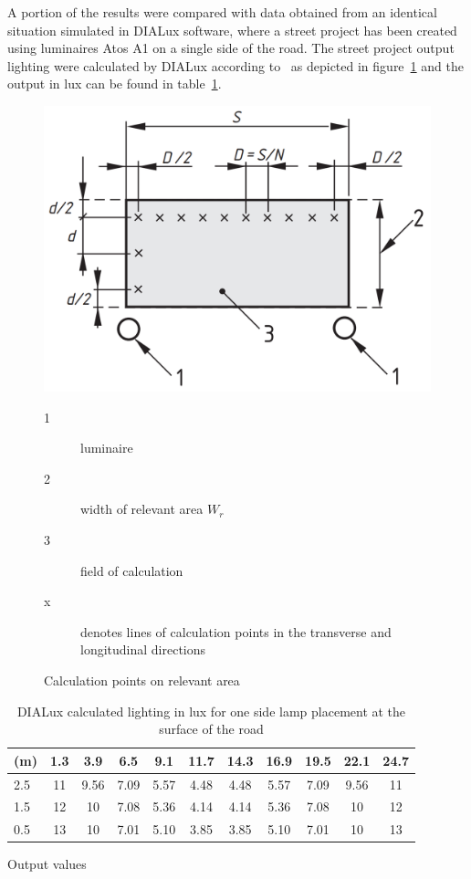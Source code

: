A portion of the results were compared with data obtained from an identical situation simulated in DIALux software, where a street project has been created using luminaires Atos A1 on a single side of the road. The street project output lighting were calculated by DIALux according to~\cite{CSN_EN_13201-3} as depicted in figure~\ref{fig:lumIntDistr} and the output in lux can be found in table~\ref{tab:DialuxOneSideLamps}.

\begin{figure}[htb]
  \centering
  \includegraphics[width=0.8\columnwidth]{13201-3_points}
	\begin{description}
		\item[1] luminaire
		\item[2] width of relevant area $W_{r}$
		\item[3] field of calculation
		\item[x] denotes lines of calculation points in the transverse and longitudinal directions
	\end{description}
	\caption{Calculation points on relevant area \cite{CSN_EN_13201-3}}
  \label{fig:lumIntDistr}
\end{figure}

\begin{table}[htb]
	\renewcommand{\arraystretch}{1.3}
	\caption{DIALux calculated lighting in lux for one side lamp placement at the surface of the road}
 	\label{tab:DialuxOneSideLamps}
	\centering
  \begin{tabular}{ l || c | c | c | c | c | c | c | c | c | c }
    \hline
    \textbf{(m)} & 1.3 & 3.9 & 6.5 & 9.1 & 11.7 & 14.3 & 16.9 & 19.5 & 22.1 & 24.7\\ \hline \hline
    2.5 & 11 & 9.56 & 7.09 & 5.57 & 4.48 & 4.48 & 5.57 & 7.09 & 9.56 & 11\\ \hline
		1.5 & 12 & 10 & 7.08 & 5.36 & 4.14 & 4.14 & 5.36 & 7.08 & 10 & 12\\ \hline
		0.5 & 13 & 10 & 7.01 & 5.10 & 3.85 & 3.85 & 5.10 & 7.01 & 10 & 13\\ \hline
  \end{tabular}
\end{table}

Output values        
